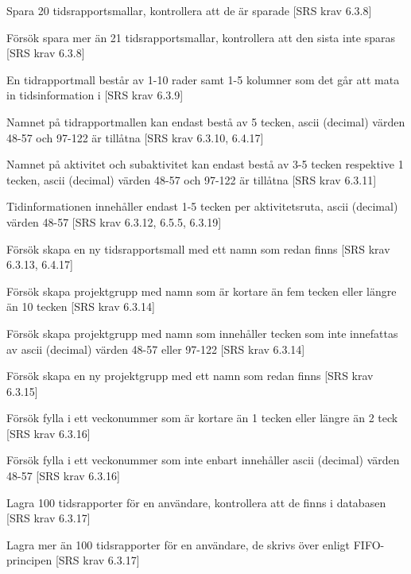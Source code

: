 \documentclass[a4paper]{article}
\begin{document}
\begin{appendices}
\begin{FT}
\item
Spara 20 tidsrapportsmallar, kontrollera att de är sparade [SRS krav 6.3.8]

\item
Försök spara mer än 21 tidsrapportsmallar, kontrollera att den sista inte sparas [SRS krav 6.3.8]

\item
En tidrapportmall består av 1-10 rader samt 1-5 kolumner som det går att mata in tidsinformation i [SRS krav 6.3.9]

\item
Namnet på tidrapportmallen kan endast bestå av 5 tecken, ascii (decimal) värden 48-57 och
97-122 är tillåtna [SRS krav 6.3.10, 6.4.17]

\item
Namnet på aktivitet och subaktivitet kan endast bestå av 3-5 tecken respektive 1 tecken, ascii (decimal) värden 48-57 och 97-122 är tillåtna [SRS krav 6.3.11]

\item
Tidinformationen innehåller endast 1-5 tecken per aktivitetsruta, ascii (decimal) värden 48-57 [SRS krav 6.3.12, 6.5.5, 6.3.19]

\item
Försök skapa en ny tidsrapportsmall med ett namn som redan finns [SRS krav 6.3.13, 6.4.17]

\item
Försök skapa projektgrupp med namn som är kortare än fem tecken eller längre än 10 tecken [SRS krav 6.3.14]

\item
Försök skapa projektgrupp med namn som innehåller tecken som inte innefattas av ascii (decimal) värden 48-57 eller 97-122 [SRS krav 6.3.14]

\item
Försök skapa en ny projektgrupp med ett namn som redan finns [SRS krav 6.3.15]

\item
Försök fylla i ett veckonummer som är kortare än 1 tecken eller längre än 2 teck [SRS krav 6.3.16]

Försök fylla i ett veckonummer som inte enbart innehåller ascii (decimal) värden 48-57 [SRS krav 6.3.16]

\item
Lagra 100 tidsrapporter för en användare, kontrollera att de finns i databasen [SRS krav 6.3.17]

\item
Lagra mer än 100 tidsrapporter för en användare, de skrivs över enligt FIFO-principen [SRS krav 6.3.17]


\end{FT}
\end{appendices}
\end{document}
